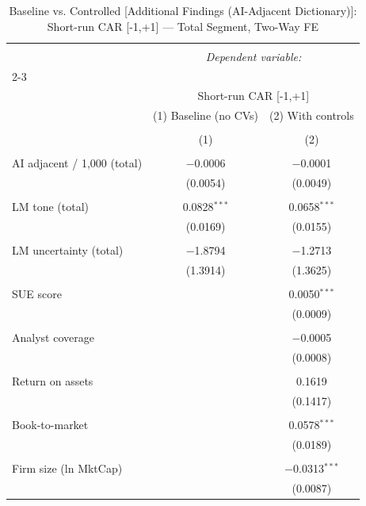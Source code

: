 
\begin{table}[!htbp] \centering 
  \caption{Baseline vs. Controlled [Additional Findings (AI-Adjacent Dictionary)]: Short-run CAR [-1,+1] — Total Segment, Two-Way FE} 
  \label{} 
\begin{tabular}{@{\extracolsep{5pt}}lcc} 
\\[-1.8ex]\hline 
\hline \\[-1.8ex] 
 & \multicolumn{2}{c}{\textit{Dependent variable:}} \\ 
\cline{2-3} 
\\[-1.8ex] & \multicolumn{2}{c}{Short-run CAR [-1,+1]} \\ 
 & (1) Baseline (no CVs) & (2) With controls \\ 
\\[-1.8ex] & (1) & (2)\\ 
\hline \\[-1.8ex] 
 AI adjacent / 1,000 (total) & $-$0.0006 & $-$0.0001 \\ 
  & (0.0054) & (0.0049) \\ 
  & & \\ 
 LM tone (total) & 0.0828$^{***}$ & 0.0658$^{***}$ \\ 
  & (0.0169) & (0.0155) \\ 
  & & \\ 
 LM uncertainty (total) & $-$1.8794 & $-$1.2713 \\ 
  & (1.3914) & (1.3625) \\ 
  & & \\ 
 SUE score &  & 0.0050$^{***}$ \\ 
  &  & (0.0009) \\ 
  & & \\ 
 Analyst coverage &  & $-$0.0005 \\ 
  &  & (0.0008) \\ 
  & & \\ 
 Return on assets &  & 0.1619 \\ 
  &  & (0.1417) \\ 
  & & \\ 
 Book-to-market &  & 0.0578$^{***}$ \\ 
  &  & (0.0189) \\ 
  & & \\ 
 Firm size (ln MktCap) &  & $-$0.0313$^{***}$ \\ 
  &  & (0.0087) \\ 

\end{tabular}
\end{table}
